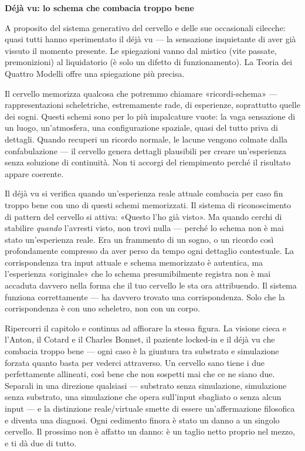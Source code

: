\documentclass[11pt, twoside, openright]{book}
\begin{document}
\textbf{Déjà vu: lo schema che combacia troppo bene}

A proposito del sistema generativo del cervello e delle sue occasionali cilecche: quasi tutti hanno sperimentato il déjà vu --- la sensazione inquietante di aver già vissuto il momento presente. Le spiegazioni vanno dal mistico (vite passate, premonizioni) al liquidatorio (è solo un difetto di funzionamento). La Teoria dei Quattro Modelli offre una spiegazione più precisa.

Il cervello memorizza qualcosa che potremmo chiamare «ricordi-schema» --- rappresentazioni scheletriche, estremamente rade, di esperienze, soprattutto quelle dei sogni. Questi schemi sono per lo più impalcature vuote: la vaga sensazione di un luogo, un'atmosfera, una configurazione spaziale, quasi del tutto priva di dettagli. Quando recuperi un ricordo normale, le lacune vengono colmate dalla confabulazione --- il cervello genera dettagli plausibili per creare un'esperienza senza soluzione di continuità. Non ti accorgi del riempimento perché il risultato appare coerente.

Il déjà vu si verifica quando un'esperienza reale attuale combacia per caso fin troppo bene con uno di questi schemi memorizzati. Il sistema di riconoscimento di pattern del cervello si attiva: «Questo l'ho già visto». Ma quando cerchi di stabilire \textit{quando} l'avresti visto, non trovi nulla --- perché lo schema non è mai stato un'esperienza reale. Era un frammento di un sogno, o un ricordo così profondamente compresso da aver perso da tempo ogni dettaglio contestuale. La corrispondenza tra input attuale e schema memorizzato è autentica, ma l'esperienza «originale» che lo schema presumibilmente registra non è mai accaduta davvero nella forma che il tuo cervello le sta ora attribuendo. Il sistema funziona correttamente --- ha davvero trovato una corrispondenza. Solo che la corrispondenza è con uno scheletro, non con un corpo.

Ripercorri il capitolo e continua ad affiorare la stessa figura. La visione cieca e l'Anton, il Cotard e il Charles Bonnet, il paziente locked-in e il déjà vu che combacia troppo bene --- ogni caso è la giuntura tra substrato e simulazione forzata quanto basta per vederci attraverso. Un cervello sano tiene i due perfettamente allineati, così bene che non sospetti mai che ce ne siano due. Separali in una direzione qualsiasi --- substrato senza simulazione, simulazione senza substrato, una simulazione che opera sull'input sbagliato o senza alcun input --- e la distinzione reale/\allowbreak{}virtuale smette di essere un'affermazione filosofica e diventa una diagnosi. Ogni cedimento finora è stato un danno a un singolo cervello. Il prossimo non è affatto un danno: è un taglio netto proprio nel mezzo, e ti dà due di tutto.
\end{document}

